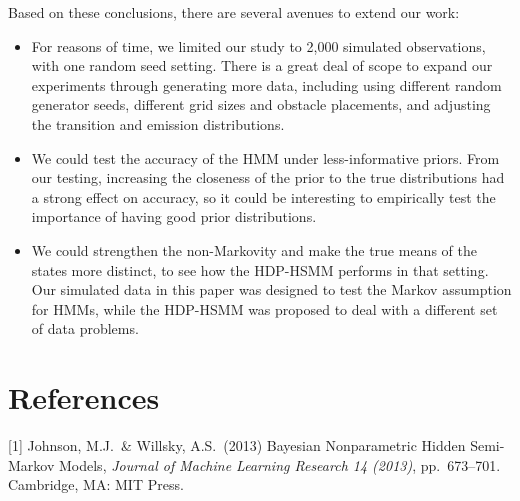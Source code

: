 \documentclass{article}
\begin{document}
Based on these conclusions, there are several avenues to extend our work:

\begin{itemize}
	\item For reasons of time, we limited our study to 2,000 simulated observations, with one random seed setting. There is a great deal of scope to expand our experiments through generating more data, including using different random generator seeds, different grid sizes and obstacle placements, and adjusting the transition and emission distributions.
	\item We could test the accuracy of the HMM under less-informative priors. From our testing, increasing the closeness of the prior to the true distributions had a strong effect on accuracy, so it could be interesting to empirically test the importance of having good prior distributions.
	\item We could strengthen the non-Markovity and make the true means of the states more distinct, to see how the HDP-HSMM performs in that setting. Our simulated data in this paper was designed to test the Markov assumption for HMMs, while the HDP-HSMM was proposed to deal with a different set of data problems.
\end{itemize}

\newpage

\section*{References}
\medskip

\small

[1] Johnson, M.J.\ \& Willsky, A.S.\ (2013) Bayesian Nonparametric Hidden Semi-Markov Models, {\it Journal of Machine Learning Research 14 (2013)},
pp.\ 673--701. Cambridge, MA: MIT Press.
\end{document}
